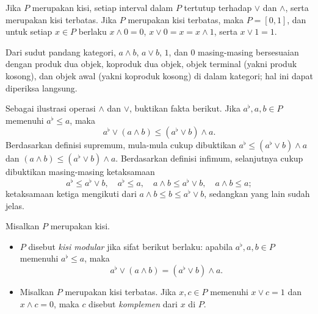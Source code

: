 Jika $P$ merupakan kisi, setiap interval dalam $P$ tertutup terhadap $\vee$
dan $\wedge$, serta merupakan kisi terbatas. Jika $P$ merupakan kisi terbatas,
maka $P=[0,1]$, dan untuk setiap $x \in P$ berlaku
$x \wedge 0=0$, $x \vee 0=x=x \wedge 1$, serta $x \vee 1=1$.

Dari sudut pandang kategori, $a \wedge b$, $a \vee b$, $1$, dan $0$ masing-masing
bersesuaian dengan produk dua objek, koproduk dua objek, objek terminal (yakni
produk kosong), dan objek awal (yakni koproduk kosong) di dalam kategori; hal
ini dapat diperiksa langsung.

Sebagai ilustrasi operasi $\wedge$ dan $\vee$, buktikan fakta berikut. Jika
$a^\flat,a,b \in P$ memenuhi $a^\flat \leq a$, maka
\begin{equation}\label{eqn:modular-inequality}
	a^\flat \vee (a \wedge b) \leq (a^\flat \vee b) \wedge a.
\end{equation}
Berdasarkan definisi supremum, mula-mula cukup dibuktikan
$a^\flat \leq (a^\flat \vee b) \wedge a$ dan
$(a \wedge b) \leq (a^\flat \vee b) \wedge a$. Berdasarkan definisi infimum,
selanjutnya cukup dibuktikan masing-masing ketaksamaan
\[ a^\flat \leq a^\flat \vee b, \quad a^\flat \leq a, \quad a \wedge b \leq a^\flat \vee b, \quad a \wedge b \leq a; \]
ketaksamaan ketiga mengikuti dari $a \wedge b \leq b \leq a^\flat \vee b$,
sedangkan yang lain sudah jelas.

\begin{definisi}\label{def:modular-lattice}
	Misalkan $P$ merupakan kisi.
	\begin{itemize}
		\item $P$ disebut \emph{kisi modular} jika sifat berikut berlaku: apabila
		$a^\flat,a,b \in P$ memenuhi $a^\flat \leq a$, maka
		\[ a^\flat \vee (a \wedge b) = (a^\flat \vee b) \wedge a. \]
		\item Misalkan $P$ merupakan kisi terbatas. Jika $x,c \in P$ memenuhi
		$x \vee c=1$ dan $x \wedge c=0$, maka $c$ disebut \emph{komplemen} dari
		$x$ di $P$.
	\end{itemize}
\end{definisi}

